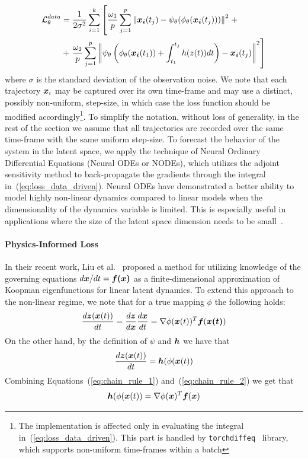 \begin{align}
    \label{eq:loss_data_driven}
    \operatorname{\mathcal{L}}^{data}_\theta & = \frac{1}{2\sigma^2}\sum_{i = 1}^k \left[\frac{\omega_1}{p}\sum_{j=1}^p\left\|\boldsymbol{x_i}(t_j) - \psi_\theta(\phi_\theta(\boldsymbol{x_i}(t_j)))\right\|^2\right. + \\
     & + \left.\frac{\omega_2}{p}\sum_{j=1}^p \left\|\psi_\theta\left(\phi_\theta(\boldsymbol{x_i}(t_1)) + \int_{t_1}^{t_j}h(z(t))dt\right) - \boldsymbol{x_i}(t_j)\right\|^2 \right]
\end{align}
where $\sigma$ is the standard deviation of the observation noise. We note that each trajectory $\boldsymbol{x}_i$ may be captured over its own time-frame and may use a distinct, possibly non-uniform, step-size, in which case the loss function should be modified accordingly\footnote{The implementation is affected only in evaluating the integral in~(\ref{eq:loss_data_driven}). This part is handled by \texttt{torchdiffeq}~\cite{chen2018neural} library, which supports non-uniform time-frames within a batch}. To simplify the notation, without loss of generality, in the rest of the section we assume that all trajectories are recorded over the same time-frame with the same uniform step-size. To forecast the behavior of the system in the latent space, we apply the technique of Neural Ordinary Differential Equations (Neural ODEs or NODEs)\cite{chen2018neuralode}, which utilizes the adjoint sensitivity method to back-propagate the gradients through the integral in~(\ref{eq:loss_data_driven}). Neural ODEs have demonstrated a better ability to model highly non-linear dynamics compared to linear models when the dimensionality of the dynamics variable is limited. This is especially useful in applications where the size of the latent space dimension needs to be small~\cite{lee2020model,gin2021deep,champion2019data,kim2019deep}.

\paragraph{Physics-Informed Loss} In their recent work, Liu et al.~\cite{liu2022physics} proposed a method for utilizing knowledge of the governing equations $d\boldsymbol{x}/dt = \boldsymbol{f(x)}$ as a finite-dimensional approximation of Koopman eigenfunctions for linear latent dynamics. To extend this approach to the non-linear regime, we note that for a true mapping $\phi$ the following holds:
\begin{equation}
    \label{eq:chain_rule_1}
    \frac{d\boldsymbol{z}(\boldsymbol{x}(t))}{dt} = \frac{d\boldsymbol{z}}{d\boldsymbol{x}}\frac{d\boldsymbol{x}}{dt} = \nabla\phi(\boldsymbol{x}(t))^T\boldsymbol{f}(\boldsymbol{x(t)})
\end{equation}
On the other hand, by the definition of $\psi$ and $\boldsymbol{h}$ we have that
\begin{equation}
    \label{eq:chain_rule_2}
    \frac{d\boldsymbol{z}(\boldsymbol{x}(t))}{dt} = \boldsymbol{h}(\phi(\boldsymbol{x}(t))
\end{equation}
Combining Equations~(\ref{eq:chain_rule_1}) and~(\ref{eq:chain_rule_2}) we get that
\begin{equation}
    \label{eq:physsics_informed_equation}
    \boldsymbol{h}(\phi(\boldsymbol{x}(t)) = \nabla\phi(\boldsymbol{x})^T\boldsymbol{f}(\boldsymbol{x})
\end{equation}

